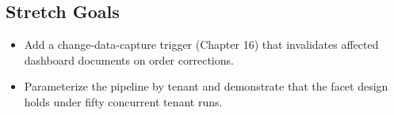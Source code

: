 \subsection*{Stretch Goals}
\begin{itemize}
    \item Add a change-data-capture trigger (Chapter 16) that invalidates affected dashboard documents on order corrections.
    \item Parameterize the pipeline by tenant and demonstrate that the facet design holds under fifty concurrent tenant runs.
\end{itemize}
